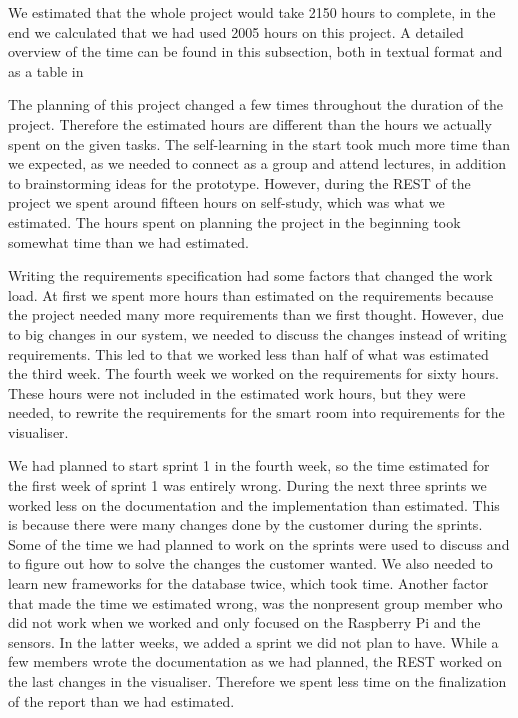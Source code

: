 \documentclass[../document]{subfiles}
\begin{document}
We estimated that the whole project would take 2150 hours to complete, in the end we calculated that we had used 2005 hours on this project. A detailed overview of the time can be found in this subsection, both in textual format and as a table in 


The planning of this project changed a few times throughout the duration of the project. Therefore the estimated hours are different than the hours we actually spent on the given tasks. The self-learning in the start took much more time than we expected, as we needed to connect as a group and attend lectures, in addition to brainstorming ideas for the prototype. However, during the \gls{REST} of the project we spent around fifteen hours on self-study, which was what we estimated. The hours spent on planning the project in the beginning took somewhat time than we had estimated. 

Writing the requirements specification had some factors that changed the work load. At first we spent more hours than estimated on the requirements because the project needed many more requirements than we first thought. However, due to big changes in our system, we needed to discuss the changes instead of writing requirements. This led to that we worked less than half of what was estimated the third week. The fourth week we worked on the requirements for sixty hours. These hours were not included in the estimated work hours, but they were needed, to rewrite the requirements for the smart room into requirements for the visualiser.

We had planned to start sprint 1 in the fourth week, so the time estimated for the first week of sprint 1 was entirely wrong. During the next three sprints we worked less on the documentation and the implementation than estimated. This is because there were many changes done by the customer during the sprints. Some of the time we had planned to work on the sprints were used to discuss and to figure out how to solve the changes the customer wanted. We also needed to learn new frameworks for the database twice, which took time. Another factor that made the time we estimated wrong, was the nonpresent group member who did not work when we worked and only focused on the \gls{Raspberry Pi} and the sensors. In the latter weeks, we added a sprint we did not plan to have. While a few members wrote the documentation as we had planned, the \gls{REST} worked on the last changes in the visualiser. Therefore we spent less time on the finalization of the report than we had estimated. 
\end{document}
